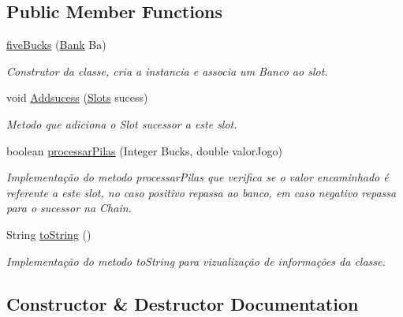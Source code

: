 \subsection*{Public Member Functions}
\begin{DoxyCompactItemize}
\item 
\mbox{\hyperlink{classchain_of_responsability_pattern_1_1five_bucks_a5ad3f97134b149f14932a694b69d86f8}{five\+Bucks}} (\mbox{\hyperlink{classmediator_pattern_1_1_bank}{Bank}} Ba)
\begin{DoxyCompactList}\small\item\em Construtor da classe, cria a instancia e associa um Banco ao slot. \end{DoxyCompactList}\item 
void \mbox{\hyperlink{classchain_of_responsability_pattern_1_1five_bucks_a13552adac1bece0a272a67a20727a52c}{Addsucess}} (\mbox{\hyperlink{interfacechain_of_responsability_pattern_1_1_slots}{Slots}} sucess)
\begin{DoxyCompactList}\small\item\em Metodo que adiciona o Slot sucessor a este slot. \end{DoxyCompactList}\item 
boolean \mbox{\hyperlink{classchain_of_responsability_pattern_1_1five_bucks_a2965b1e5ea534dbe4148a5b69d13f1a6}{processar\+Pilas}} (Integer Bucks, double valor\+Jogo)
\begin{DoxyCompactList}\small\item\em Implementação do metodo processar\+Pilas que verifica se o valor encaminhado é referente a este slot, no caso positivo repassa ao banco, em caso negativo repassa para o sucessor na Chain. \end{DoxyCompactList}\item 
String \mbox{\hyperlink{classchain_of_responsability_pattern_1_1five_bucks_ab0901d47763a116f09e0ce493bd61ade}{to\+String}} ()
\begin{DoxyCompactList}\small\item\em Implementação do metodo to\+String para vizualização de informações da classe. \end{DoxyCompactList}\end{DoxyCompactItemize}


\subsection{Constructor \& Destructor Documentation}
\mbox{\label{classchain_of_responsability_pattern_1_1five_bucks_a5ad3f97134b149f14932a694b69d86f8}} 
